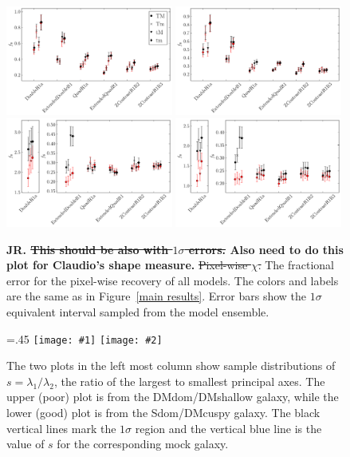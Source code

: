 \documentclass[galley,usenatbib]{mn2e}
\newcommand{\figref}[1] {Figure~\ref{#1}}
\newcommand\plottwo[2]{{%
 \centering
 \leavevmode
 \columnwidth=.45\columnwidth
 \texttt{[image: \#1]}%
 \hfil
 \texttt{[image: \#2]}%
}}%
\begin{document}
\begin{figure}
\includegraphics[width=0.49\textwidth]{AAferror-1sig.pdf}
\includegraphics[width=0.49\textwidth]{BBferror-1sig.pdf}\\
\includegraphics[width=0.49\textwidth]{ACferror-1sig.pdf}
\includegraphics[width=0.49\textwidth]{BCferror-1sig.pdf}
\caption{ {\bf JR. \sout{ This should be also with $1\sigma$ errors.} Also need to do this plot for Claudio's shape measure.} \sout{Pixel-wise $\chi$.}
The fractional error for the pixel-wise recovery of all models. The colors and labels are the same as in \figref{main results}. Error bars show the $1\sigma$ equivalent interval sampled from the model ensemble.}
\label{main results pixel-wise}
\end{figure}

\begin{figure}[h]
\plottwo{AAExtendedDoubleR1_TmS-shape-hist-11.pdf}{BCZContrastR1R3_TmS-shape-hist-212.pdf}
\caption{ The two plots in the left most column show sample distributions of
  $s=\lambda_1/\lambda_2$, the ratio of the largest to smallest principal axes.
  The upper (poor) plot is from the DMdom/DMshallow galaxy, while the lower (good) plot is
  from the Sdom/DMcuspy galaxy. The black vertical lines mark the $1\sigma$
  region and the vertical blue line is the value of $s$ for the corresponding
mock galaxy. }

\label{shape results}
\end{figure}
\end{document}
